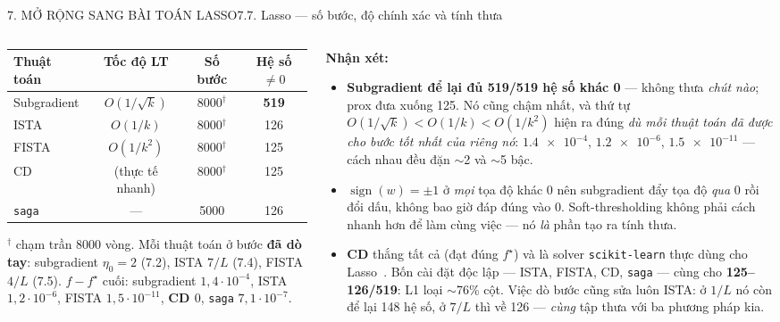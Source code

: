 \documentclass[aspectratio=169,11pt]{beamer}
\newcommand{\nx}{\textbf{Nhận xét:}}
\begin{document}
\begin{frame}{7. MỞ RỘNG SANG BÀI TOÁN LASSO}{7.7. Lasso --- số bước, độ chính xác và tính thưa}
  \begin{columns}[T]
    \begin{column}{0.44\textwidth}\scriptsize
      \begin{center}\scriptsize
      \begin{tabular}{lccc}
        \toprule
        Thuật toán & Tốc độ LT & Số bước & Hệ số $\ne0$\\
        \midrule
        Subgradient & $O(1/\sqrt k)$ & \num{8000}$^\dagger$ & \textbf{\num{519}}\\
        ISTA  & $O(1/k)$   & \num{8000}$^\dagger$ & \num{126}\\
        FISTA & $O(1/k^2)$ & \num{8000}$^\dagger$ & \num{125}\\
        CD    & (thực tế nhanh) & \num{8000}$^\dagger$ & \num{125}\\
        \texttt{saga} & --- & \num{5000} & \num{126}\\
        \bottomrule
      \end{tabular}
      \end{center}
      {\tiny $^\dagger$ chạm trần \num{8000} vòng. Mỗi thuật toán ở bước \textbf{đã dò tay}:
      subgradient $\eta_0{=}2$ (7.2), ISTA $7/L$ (7.4), FISTA $4/L$ (7.5).
      $f-f^\star$ cuối: subgradient $1{,}4\!\cdot\!10^{-4}$, ISTA $1{,}2\!\cdot\!10^{-6}$,
      FISTA $1{,}5\!\cdot\!10^{-11}$, \textbf{CD $0$}, \texttt{saga} $7{,}1\!\cdot\!10^{-7}$.}
    \end{column}
    \begin{column}{0.56\textwidth}\scriptsize
      \nx{}
      \begin{itemize}\scriptsize\itemsep=2pt
        \item \textbf{Subgradient để lại đủ \num{519}/\num{519} hệ số khác 0} --- không thưa
              \emph{chút nào}; prox đưa xuống \num{125}. Nó cũng chậm nhất, và thứ tự
              $O(1/\sqrt k)<O(1/k)<O(1/k^2)$ hiện ra đúng \emph{dù mỗi thuật toán đã được cho
              bước tốt nhất của riêng nó}: $\num{1.4e-4}$, $\num{1.2e-6}$, $\num{1.5e-11}$ ---
              cách nhau đều đặn $\sim$2 và $\sim$5 bậc.
        \item $\operatorname{sign}(w)=\pm1$ ở \emph{mọi} tọa độ khác 0 nên subgradient đẩy tọa độ
              \emph{qua} $0$ rồi đổi dấu, không bao giờ đáp đúng vào $0$. Soft-thresholding không
              phải cách nhanh hơn để làm cùng việc --- nó \emph{là} phần tạo ra tính thưa.
        \item \textbf{CD} thắng tất cả (đạt đúng $f^\star$) và là solver \texttt{scikit-learn} thực
              dùng cho Lasso~\cite{friedman2010glmnet}. Bốn cài đặt độc lập --- ISTA, FISTA, CD,
              \texttt{saga} --- cùng cho \textbf{125--126/\num{519}}: L1 loại $\sim$76\% cột.
              Việc dò bước cũng sửa luôn ISTA: ở $1/L$ nó còn để lại \num{148} hệ số, ở $7/L$ thì
              về \num{126} --- \emph{cùng} tập thưa với ba phương pháp kia.
      \end{itemize}
    \end{column}
  \end{columns}
\end{frame}
\end{document}
